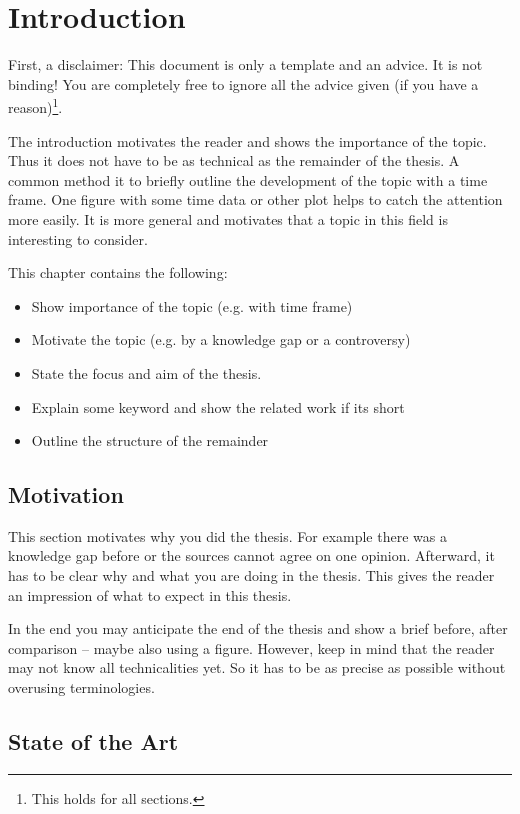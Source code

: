 \chapter{Introduction}\label{c:i}

First, a disclaimer: This document is only a template and an advice. It is not binding!
You are completely free to ignore all the advice given (if you have a reason)\footnote{This holds for all sections.}.

The introduction motivates the reader and shows the importance of the topic.
Thus it does not have to be as technical as the remainder of the thesis.
A common method it to briefly outline the development of the topic with a time frame.
One figure with some time data or other plot helps to catch the attention more easily.
It is more general and motivates that a topic in this field is interesting to consider.

This chapter contains the following:
\begin{itemize}
  \item Show importance of the topic (e.g. with time frame)
  \item Motivate the topic (e.g. by a knowledge gap or a controversy)
  \item State the focus and aim of the thesis.
  \item Explain some keyword and show the related work if its short
  \item Outline the structure of the remainder
\end{itemize}

\section{Motivation}\label{c:i:m}
This section motivates why you did the thesis. 
For example there was a knowledge gap before or the sources cannot agree on one opinion.
Afterward, it has to be clear why and what you are doing in the thesis.
This gives the reader an impression of what to expect in this thesis.

In the end you may anticipate the end of the thesis and show a brief before, after comparison -- maybe also using a figure.
However, keep in mind that the reader may not know all technicalities yet. So it has to be as precise as possible without overusing terminologies.

\section{State of the Art}\label{c:intro:rw}

